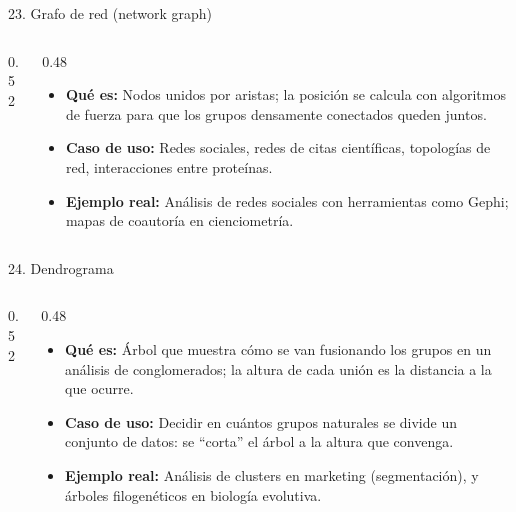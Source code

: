 \documentclass[aspectratio=169,9pt]{beamer}
\newcommand{\ficha}[3]{%
\begin{itemize}
\item \textbf{Qué es:} #1
\item \textbf{Caso de uso:} #2
\item \textbf{Ejemplo real:} #3
\end{itemize}}
\begin{document}
\begin{frame}{23. Grafo de red (network graph)}
\begin{columns}[T]
\begin{column}{0.52\textwidth}
\centering
{}
\end{column}
\begin{column}{0.48\textwidth}
\ficha{Nodos unidos por aristas; la posición se calcula con algoritmos de fuerza para que los grupos densamente conectados queden juntos.}
{Redes sociales, redes de citas científicas, topologías de red, interacciones entre proteínas.}
{Análisis de redes sociales con herramientas como Gephi; mapas de coautoría en cienciometría.}
\end{column}
\end{columns}
\end{frame}

\begin{frame}{24. Dendrograma}
\begin{columns}[T]
\begin{column}{0.52\textwidth}
\centering
{}
\end{column}
\begin{column}{0.48\textwidth}
\ficha{Árbol que muestra cómo se van fusionando los grupos en un análisis de conglomerados; la altura de cada unión es la distancia a la que ocurre.}
{Decidir en cuántos grupos naturales se divide un conjunto de datos: se ``corta'' el árbol a la altura que convenga.}
{Análisis de clusters en marketing (segmentación), y árboles filogenéticos en biología evolutiva.}
\end{column}
\end{columns}
\end{frame}
\end{document}

